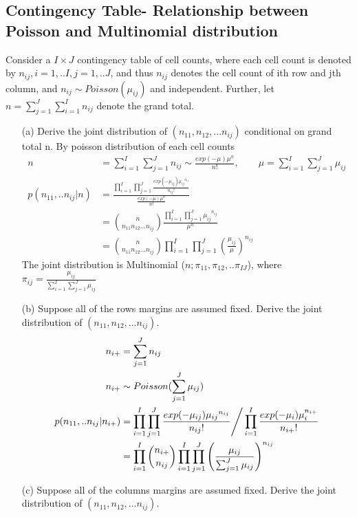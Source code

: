 \documentclass[11pt]{article} %
\begin{document}
\subsection{Contingency Table- Relationship between Poisson and Multinomial distribution}
Consider a $I \times J$ contingency table of cell counts, where each cell count is denoted by $n_{ij}, i=1,..I, j=1,..J$, and thus $n_{ij}$ denotes the cell count of ith row and jth column, and $n_{ij} \sim Poisson (\mu_{ij})$ and independent. Further, let $n= \sum_{j=1}^J \sum_{i=1}^I n_{ij}$ denote the grand total.

\begin{itemize}
	\item [(a)] Derive the joint distribution of $(n_{11}, n_{12},... n_{ij})$ conditional on grand total n.
	By poisson distribution of each cell counts
	\begin{align*}
	n &= \sum_{i=1}^I \sum_{j=1}^J n_{ij} \sim \frac{exp(-\mu) \mu^n }{n!}, \qquad \mu= \sum_{i=1}^I \sum_{j=1}^J \mu_{ij}\\ 
	p(n_{11},..n_{ij}|n) &= \frac{\prod_{i=1}^I \prod_{j=1}^J \frac{exp(-\mu_{ij})  {\mu_{ij}}^{n_{ij}}}{n_{ij}!}}{\frac{exp(-\mu) \mu^n }{n!}} \\
	&= {n \choose n_{11} n_{12} ... n_{ij}} \frac{\prod_{i=1}^I \prod_{j=1}^J {\mu_{ij}}^{n_{ij}}}{\mu^n } \\
	&= {n \choose n_{11} n_{12} ... n_{ij}} \prod_{i=1}^I \prod_{j=1}^J \left( \frac{\mu_{ij}}{\mu } \right)	^{n_{ij}}
	\end{align*}	
The joint distribution is Multinomial ($n; \pi_{11}, \pi_{12},.. \pi_{IJ}$), where $\pi_{ij} = \frac{\mu_{ij}}{\sum_{i=1}^I \sum_{j=1}^J \mu_{ij} }$
	\item [(b)] Suppose all of the rows margins are assumed fixed. Derive the joint distribution of $(n_{11}, n_{12},... n_{ij})$.
\begin{align*}
	n_{i+} &= \sum_{j=1}^J n_{ij}\\
	n_{i+} & \sim Poisson (\sum_{j=1}^J \mu_{ij})\\
	p(n_{11},..n_{ij}|n_{i+}) &= \prod_{i=1}^I \prod_{j=1}^J \frac{exp(-\mu_{ij})  {\mu_{ij}}^{n_{ij}}}{n_{ij}!} \Bigg{/} \prod_{i=1}^I \frac{exp(-\mu_i) \mu_i^{n_{i+}}}{n_{i+}!}\\
	&= \prod_{i=1}^I {n_{i+} \choose n_{ij}} \prod_{i=1}^I \prod_{j=1}^J \left( \frac{\mu_{ij}}{\sum_{j=1}^J \mu_{ij}} \right)^{n_{ij}}
\end{align*}
	\item [(c)] Suppose all of the columns margins are assumed fixed. Derive the joint distribution of $(n_{11}, n_{12},... n_{ij})$.

\end{itemize}
\end{document}
